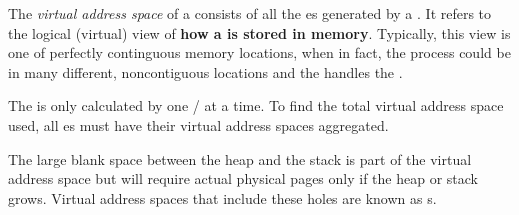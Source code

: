 \begin{definition}\label{def:Virtual_Address_Space}
  The \emph{virtual address space} of a  consists of all the es generated by a .
  It refers to the logical (virtual) view of \textbf{how a  is stored in memory}.
  Typically, this view is one of perfectly continguous memory locations, when in fact, the process could be in many different, noncontiguous locations and the  handles the .

  \begin{remark}
    The  is only calculated by one / at a time.
    To find the total virtual address space used, all es must have their virtual address spaces aggregated.
  \end{remark}
\end{definition}

The large blank space between the heap and the stack is part of the virtual address space but will require actual physical pages only if the heap or stack grows.
Virtual address spaces that include these holes are known as s.


